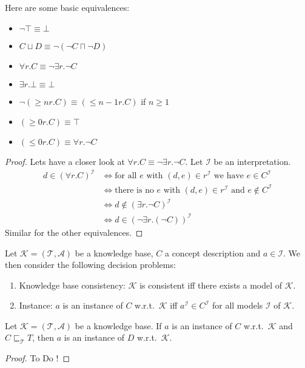 \begin{lemma}
	Here are some basic equivalences:
	\begin{itemize}
		\item $\neg \top \equiv \bot$
		\item $C \sqcup D \equiv \neg \left( \neg C \sqcap \neg D \right)$
		\item $\forall r.C \equiv \neg \exists r.\neg C$
		\item $\exists r.\bot \equiv \bot$
		\item $\neg \left( \geq nr.C \right) \equiv \left( \leq n-1 r.C \right)$ if $n \geq 1$
		\item $\left( \geq 0 r.C \right) \equiv \top$
		\item $\left( \leq 0r.C \right) \equiv \forall r.\neg C$
	 \end{itemize}
\end{lemma}
\begin{proof}
	Lets have a closer look at $\forall r.C \equiv \neg \exists r.\neg C $.
	Let $\mathcal{I}$ be an interpretation.
	\begin{align*}
		d \in \left( \forall r.C \right)^{\mathcal{I}} & \iff \text{for all $e$ with $(d,e)\in r^{\mathcal{I}}$ we have $e \in C^{\mathcal{I}}$} \\
							& \iff \text{there is no $e$ with $(d,e)\in r^{\mathcal{I}}$ and $e \notin C^{\mathcal{I}}$} \\
							& \iff d  \notin \left( \exists r.\neg C \right)^{\mathcal{I}} \\
							& \iff d \in \left( \neg \exists r.(\neg C) \right)^{\mathcal{I}}
	\end{align*}
	Similar for the other equivalences. \qedhere
\end{proof}

\begin{definition}
	Let $\mathcal{K} = \left( \mathcal{T}, \mathcal{A} \right)$ be a knowledge base, 
	$C$ a concept description and $a \in \mathscr{I}$.
	We then consider the following decision problems:
	\begin{enumerate}
		\item Knowledge base consistency: $\mathcal{K}$ is consistent iff there exists a model of $\mathcal{K}$.
		\item Instance: $a$ is an instance of $C$ w.r.t.\ $\mathcal{K}$ iff $a^{\mathcal{I}} \in C^{\mathcal{I}}$ 
			for all models $\mathcal{I}$ of $\mathcal{K}$.
	\end{enumerate}
\end{definition}
\begin{lemma}
	Let $\mathcal{K} = \left( \mathcal{T}, \mathcal{A} \right)$ be a knowledge base.
	If $a$ is an instance of $C$ w.r.t.\ $\mathcal{K}$ and $C \sqsubseteq_{\mathcal{T}} T$,
	then $a$ is an instance of $D$ w.r.t.\ $\mathcal{K}$.
\end{lemma}
\begin{proof}
	To Do !
\end{proof}

